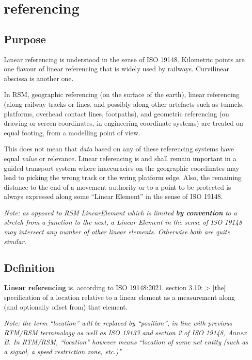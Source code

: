 \documentclass[
  11pt,
]{article}
\begin{document}
\hypertarget{referencing}{%
\section{referencing}\label{referencing}}

\hypertarget{purpose-1}{%
\subsection{Purpose}\label{purpose-1}}

Linear referencing is understood in the sense of ISO 19148. Kilometric
points are one flavour of linear referencing that is widely used by
railways. Curvilinear abscissa is another one.

In RSM, geographic referencing (on the surface of the earth), linear
referencing (along railway tracks or lines, and possibly along other
artefacts such as tunnels, platforms, overhead contact lines,
footpaths), and geometric referencing (on drawing or screen coordinates,
in engineering coordinate systems) are treated on equal footing, from a
modelling point of view.

This does not mean that \emph{data} based on any of these referencing
systems have equal \emph{value} or relevance. Linear referencing is and
shall remain important in a guided transport system where inaccuracies
on the geographic coordinates may lead to picking the wrong track or the
wring platform edge. Also, the remaining distance to the end of a
movement authority or to a point to be protected is always expressed
along some ``Linear Element'' in the sense of ISO 19148.

\emph{Note: as opposed to RSM LinearElement which is limited \textbf{by
convention} to a stretch from a junction to the next, a Linear Element
in the sense of ISO 19148 may intersect any number of other linear
elements. Otherwise both are quite similar.}

\hypertarget{definition}{%
\subsection{Definition}\label{definition}}

\textbf{Linear referencing} is, according to ISO 19148:2021, section
3.10: \textgreater{} {[}the{]} specification of a location relative to a
linear element as a measurement along (and optionally offset from) that
element.

\emph{Note: the term ``location'' will be replaced by ``position'', in
line with previous RTM/RSM terminology as well as ISO 19133 and section
2 of ISO 19148, Annex B. In RTM/RSM, ``location'' however means
``location \emph{of some net entity} (such as a signal, a speed
restriction zone, etc.)''}
\end{document}
